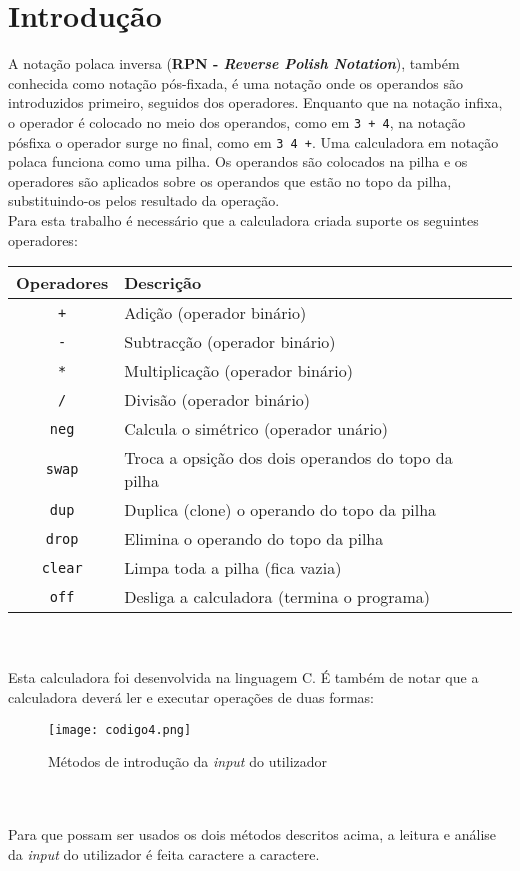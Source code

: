 \documentclass[12pt, a4paper]{article}
\begin{document}
    \section{Introdução}
        A notação polaca inversa (\textbf{RPN - \textit{Reverse Polish Notation}}), também conhecida como notação pós-fixada, é uma notação onde os operandos são introduzidos primeiro, seguidos dos operadores. Enquanto que na notação infixa, o operador é colocado no meio dos operandos, como em \texttt{3 + 4}, na notação pósfixa o operador surge no final, como em \texttt{3 4 +}. Uma calculadora em notação polaca funciona como uma pilha. Os operandos são colocados na pilha e os operadores são aplicados sobre os operandos que estão no topo da pilha, substituindo-os pelos resultado da operação.\\
        Para esta trabalho é necessário que a calculadora criada suporte os seguintes operadores:
        \begin{table}[h]
            \centering
            \begin{tabular}{c  lr}
                \hline
                Operadores & Descrição\\
                \hline
                \texttt{+} & Adição (operador binário)\\
                \texttt{-} & Subtracção (operador binário)\\
                \texttt{*} & Multiplicação (operador binário)\\
                \texttt{/} & Divisão (operador binário)\\
                \texttt{neg} & Calcula o simétrico (operador unário)\\
                \texttt{swap} & Troca a opsição dos dois operandos do topo da pilha\\
                \texttt{dup} & Duplica (clone) o operando do topo da pilha\\
                \texttt{drop} & Elimina o operando do topo da pilha\\
                \texttt{clear} & Limpa toda a pilha (fica vazia)\\
                \texttt{off} & Desliga a calculadora (termina o programa)\\
                \hline
            \end{tabular}
        \end{table}
        \\
        \\Esta calculadora foi desenvolvida na linguagem C. É também de notar que a calculadora deverá ler e executar operações de duas formas:\\
        \begin{figure}[h]
            \centering
            \texttt{[image: codigo4.png]}
            \caption{Métodos de introdução da \textit{input} do utilizador}
        \end{figure}
        \\
        \\Para que possam ser usados os dois métodos descritos acima, a leitura e análise da \textit{input} do utilizador é feita caractere a caractere.
    \newpage       
       
\end{document}
